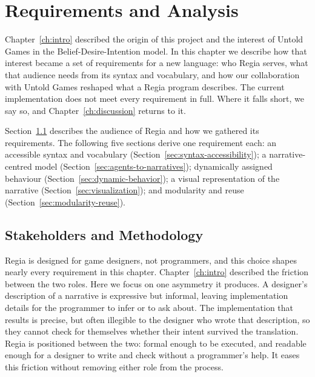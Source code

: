 \chapter{Requirements and Analysis}
\label{ch:requirements}

Chapter~\ref{ch:intro} described the origin of this project and the interest of Untold Games in the Belief-Desire-Intention model. In this chapter we describe how that interest became a set of requirements for a new language: who Regia serves, what that audience needs from its syntax and vocabulary, and how our collaboration with Untold Games reshaped what a Regia program describes. The current implementation does not meet every requirement in full. Where it falls short, we say so, and Chapter~\ref{ch:discussion} returns to it.

Section~\ref{sec:stakeholders} describes the audience of Regia and how we gathered its requirements. The following five sections derive one requirement each: an accessible syntax and vocabulary (Section~\ref{sec:syntax-accessibility}); a narrative-centred model (Section~\ref{sec:agents-to-narratives}); dynamically assigned behaviour (Section~\ref{sec:dynamic-behavior}); a visual representation of the narrative (Section~\ref{sec:visualization}); and modularity and reuse (Section~\ref{sec:modularity-reuse}).

\section{Stakeholders and Methodology}
\label{sec:stakeholders}

Regia is designed for game designers, not programmers, and this choice shapes nearly every requirement in this chapter. Chapter~\ref{ch:intro} described the friction between the two roles. Here we focus on one asymmetry it produces. A designer's description of a narrative is expressive but informal, leaving implementation details for the programmer to infer or to ask about. The implementation that results is precise, but often illegible to the designer who wrote that description, so they cannot check for themselves whether their intent survived the translation. Regia is positioned between the two: formal enough to be executed, and readable enough for a designer to write and check without a programmer's help. It eases this friction without removing either role from the process.

